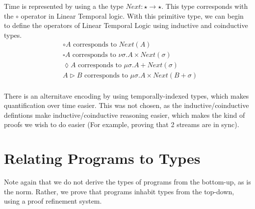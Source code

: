 \documentclass{article}
\begin{document}
Time is represented by using a the type $Next : \star \rightarrow \star$. This type corresponds with the $\circ$ operator in Linear Temporal logic. With this primitive type, we can begin to define the operators of Linear Temporal Logic using inductive and coinductive types.
\begin{align*}
    &\circ A \text{ corresponds to } Next(A) \\
    &\square A \text{ corresponds to } \nu \sigma . A \times Next(\sigma) \\
    &\lozenge A \text{ corresponds to } \mu \sigma . A + Next(\sigma) \\
    &A \triangleright B \text{ corresponds to } \mu \sigma . A \times Next(B + \sigma) \\ 
\end{align*}

There is an alternitave encoding by using temporally-indexed types, which makes quantification over time easier. This was not chosen, as the inductive/coinductive defintions make inductive/coinductive reasoning easier, which makes the kind of proofs we wish to do easier (For example, proving that 2 streams are in sync).



\section{Relating Programs to Types}
Note again that we do not derive the types of programs from the bottom-up, as is the norm. Rather, we prove that programs inhabit types from the top-down, using a proof refinement system.
\end{document}
